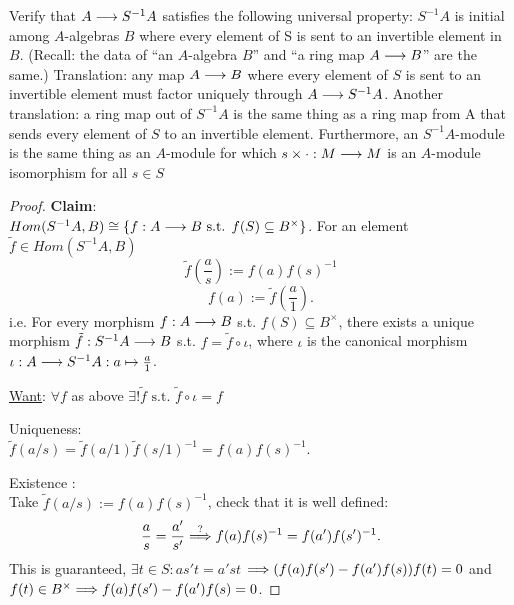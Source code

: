 \documentclass[11pt,fleqn]{book} %
\begin{document}
\begin{exr}
Verify that $A\longrightarrow S^{-1}A$ satisfies the following universal property: $S^{-1}A$ is initial among $A$-algebras $B$ where every element of S is sent to an invertible element in $B$. (Recall: the data of “an $A$-algebra $B$” and “a ring map $A \longrightarrow B$” are the same.) Translation: any map $A \longrightarrow B $ where every element of $S$ is sent to an invertible element must factor uniquely through $A\longrightarrow S^{-1}A$. Another translation: a ring map out of $S^{-1}A$ is the same thing as a ring map from A that sends every element of $S$ to an invertible element. Furthermore, an $S^{-1}A$-module is the same thing as an $A$-module for which $s\times\cdot : M\longrightarrow M$ is an $A$-module isomorphism for all $s \in S$
\end{exr}
\begin{proof}
\textbf{Claim}:\\
$Hom(S^{-1}{A},{B})\cong \{f:{A}\longrightarrow {B}\text{ s.t. } f(S)\subseteq {B}^{\times}\}$. 
For an element $\tilde{f}\in Hom(S^{-1}{A},{B})$
$$
\tilde{f}\left(\frac{a}{s}\right):=f(a)f(s)^{-1}
$$
$$
f(a):=\tilde{f}\left(\frac{a}{1}\right).
$$
i.e. For every morphism $f:{A}\longrightarrow{B}$ s.t. $f(S)\subseteq {B}^{\times}$, there exists a unique morphism $\tilde{f}:S^{-1}{A}\longrightarrow {B}$ s.t. $f=\tilde{f}\circ\iota$, where $\iota $ is the canonical morphism $\iota:{A}\longrightarrow S^{-1}{A}:a\mapsto \frac{a}{1}$.
\begin{center}
\end{center}

\underline{Want}: $\forall f$ as above $\exists ! \tilde{f}\text{ s.t. } \tilde{f}\circ\iota=f$

Uniqueness:\\
$\tilde{f}(a/s)=\tilde{f}(a/1)\tilde{f}(s/1)^{-1}=f(a)f(s)^{-1}$.

Existence :\\
Take $\tilde{f}(a/s):=f(a)f(s)^{-1}$, check that it is well defined:
$$
\frac{a}{s}=\frac{a'}{s'}\overset{?}{\Longrightarrow} f(a)f(s)^{-1}=f(a')f(s')^{-1}.
$$
This is guaranteed, $\exists t\in S: as' t=a's t$ $\Longrightarrow (f(a)f(s')-f(a')f(s))f(t)=0$ and $f(t)\in {B}^{\times}\Longrightarrow f(a)f(s')-f(a')f(s)=0$.
\end{proof}
\end{document}
